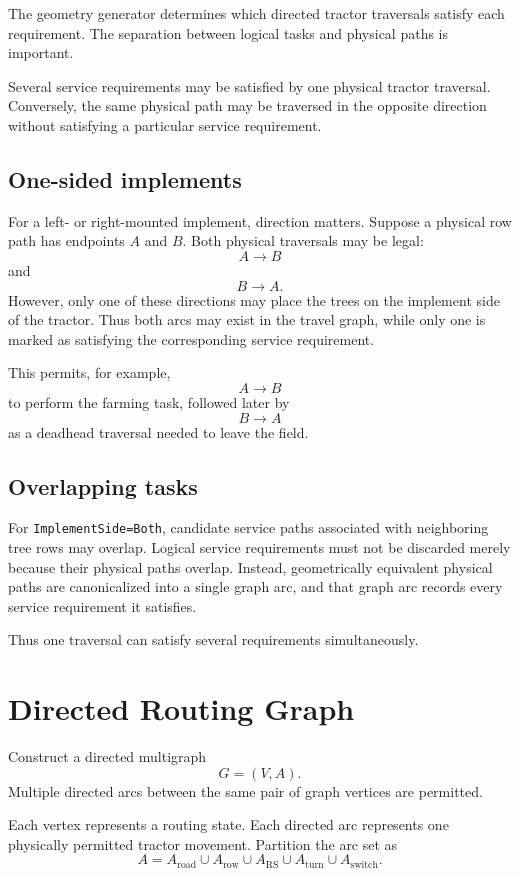 \documentclass{article}
\begin{document}
The geometry generator determines which directed tractor traversals satisfy each requirement.
The separation between logical tasks and physical paths is important.

Several service requirements may be satisfied by one physical tractor traversal. Conversely, the same physical path may be traversed in the opposite direction without satisfying a particular service requirement.

\subsection{One-sided implements}

For a left- or right-mounted implement, direction matters.
Suppose a physical row path has endpoints $A$ and $B$.
Both physical traversals may be legal:
$$
A\rightarrow B
$$
and
$$
B\rightarrow A.
$$
However, only one of these directions may place the trees on the implement side of the tractor.
Thus both arcs may exist in the travel graph, while only one is marked as satisfying the corresponding service requirement.

This permits, for example,
$$
A\rightarrow B
$$
to perform the farming task, followed later by
$$
B\rightarrow A
$$
as a deadhead traversal needed to leave the field.

\subsection{Overlapping tasks}

For \texttt{ImplementSide=Both}, candidate service paths associated with neighboring tree rows may overlap.
Logical service requirements must not be discarded merely because their physical paths overlap.
Instead, geometrically equivalent physical paths are canonicalized into a single graph arc, and that graph arc records every service requirement it satisfies.

Thus one traversal can satisfy several requirements simultaneously.

\section{Directed Routing Graph}

Construct a directed multigraph
$$
G=(V,A).
$$
Multiple directed arcs between the same pair of graph vertices are permitted.

Each vertex represents a routing state.
Each directed arc represents one physically permitted tractor movement.
Partition the arc set as
$$
A =
A_{\mathrm{road}}
\cup
A_{\mathrm{row}}
\cup
A_{\mathrm{RS}}
\cup
A_{\mathrm{turn}}
\cup
A_{\mathrm{switch}}.
$$
\end{document}
